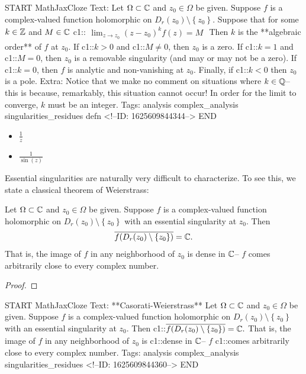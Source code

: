 \documentclass{memoir}
\begin{document}
\begin{anki}
START
MathJaxCloze
Text: Let \(\Omega \subset \mathbb{C}\) and \(z_0 \in \Omega \) be given. Suppose \(f\) is a complex-valued function holomorphic on \(D_r(z_0)\setminus\left\{ z_0 \right\} \). Suppose that for some \(k \in \mathbb{Z}\) and \(M \in \mathbb{C}\)
 {{c1::\(\begin{align*}
         \lim_{z \to z_0} (z-z_0)^{k}f(z) =M
         \end{align*}\)}}
	Then \(k\) is the **algebraic order** of \(f\) at \(z_0\). If {{c1::\(k>0\)}} and {{c1::\(M\neq 0\)}}, then \(z_0\) is a zero. If {{c1::\(k=1\)}} and {{c1::\(M=0\)}}, then \(z_0\) is a removable singularity (and may or may not be a zero). If {{c1::\(k=0\)}}, then \(f\) is analytic and non-vanishing at \(z_0\). Finally, if {{c1::\(k<0\)}} then \(z_0\) is a pole. 
Extra: Notice that we make no comment on situations where \(k \in \mathbb{Q}\)-- this is because, remarkably, this situation cannot occur! In order for the limit to converge, \(k\) must be an integer.
Tags: analysis complex_analysis singularities_residues defn
<!--ID: 1625609844344-->
END
\end{anki}

\begin{exmp}
	\begin{itemize}
		\item \(\frac{1}{z}\) 
		\item \(\frac{1}{\sin(z)}\)
	\end{itemize}
\end{exmp}

Essential singularities are naturally very difficult to characterize. To see this, we state a classical theorem of Weierstrass:
\begin{thm}
	Let \(\Omega \subset \mathbb{C}\) and \(z_0 \in \Omega \) be given. Suppose \(f\) is a complex-valued function holomorphic on \(D_r(z_0)\setminus \left\{ z_0 \right\} \) with an essential singularity at \(z_0\). Then
	\begin{align*}
		\overline{f(D_r(z_0)\setminus\left\{ z_0 \right\} )} = \mathbb{C}.
	\end{align*}
	That is, the image of \(f\) in any neighborhood of \(z_0\) is dense in \(\mathbb{C}\)-- \(f\) comes arbitrarily close to every complex number.
\end{thm}
\begin{proof}
	
\end{proof}

\begin{anki}
START
MathJaxCloze
Text: **Casorati-Weierstrass**
Let \(\Omega \subset \mathbb{C}\) and \(z_0 \in \Omega \) be given. Suppose \(f\) is a complex-valued function holomorphic on \(D_r(z_0)\setminus \left\{ z_0 \right\} \) with an essential singularity at \(z_0\). Then
 {{c1::\(\begin{align*}
         	\overline{f(D_r(z_0)\setminus\left\{ z_0 \right\} )} = \mathbb{C}.
         \end{align*}\)}}
That is, the image of \(f\) in any neighborhood of \(z_0\) is {{c1::dense in \(\mathbb{C}\)}}-- \(f\) {{c1::comes arbitrarily close to every complex number}}.
Tags: analysis complex_analysis singularities_residues
<!--ID: 1625609844360-->
END
\end{anki}
\end{document}
